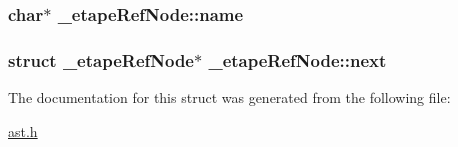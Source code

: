 \subsubsection[{\texorpdfstring{name}{name}}]{\setlength{\rightskip}{0pt plus 5cm}char$\ast$ \+\_\+etape\+Ref\+Node\+::name}\hypertarget{struct__etapeRefNode_a0b95dcf66124787e3da9d6038f3ac862}{}\label{struct__etapeRefNode_a0b95dcf66124787e3da9d6038f3ac862}
\subsubsection[{\texorpdfstring{next}{next}}]{\setlength{\rightskip}{0pt plus 5cm}struct {\bf \+\_\+etape\+Ref\+Node}$\ast$ \+\_\+etape\+Ref\+Node\+::next}\hypertarget{struct__etapeRefNode_a3108538c22adec1b6d1c4b4c49b6abad}{}\label{struct__etapeRefNode_a3108538c22adec1b6d1c4b4c49b6abad}


The documentation for this struct was generated from the following file\+:\begin{DoxyCompactItemize}
\item 
\hyperlink{ast_8h}{ast.\+h}\end{DoxyCompactItemize}
